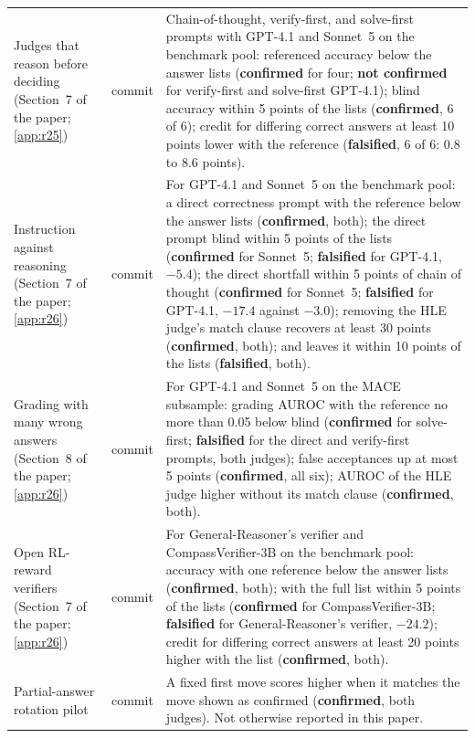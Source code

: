 {\begin{longtable}{L{3.2cm}L{1.1cm}L{8.7cm}}
Judges that reason before deciding (Section~7 of the paper; \cref{app:r25}) & commit & Chain-of-thought, verify-first, and solve-first prompts with GPT-4.1 and Sonnet~5 on the benchmark pool: referenced accuracy below the answer lists (\textbf{confirmed} for four; \textbf{not confirmed} for verify-first and solve-first GPT-4.1); blind accuracy within 5 points of the lists (\textbf{confirmed}, 6 of 6); credit for differing correct answers at least 10 points lower with the reference (\textbf{falsified}, 6 of 6: 0.8 to 8.6 points). \\
Instruction against reasoning (Section~7 of the paper; \cref{app:r26}) & commit & For GPT-4.1 and Sonnet~5 on the benchmark pool: a direct correctness prompt with the reference below the answer lists (\textbf{confirmed}, both); the direct prompt blind within 5 points of the lists (\textbf{confirmed} for Sonnet~5; \textbf{falsified} for GPT-4.1, $-5.4$); the direct shortfall within 5 points of chain of thought (\textbf{confirmed} for Sonnet~5; \textbf{falsified} for GPT-4.1, $-17.4$ against $-3.0$); removing the HLE judge's match clause recovers at least 30 points (\textbf{confirmed}, both); and leaves it within 10 points of the lists (\textbf{falsified}, both). \\
Grading with many wrong answers (Section~8 of the paper; \cref{app:r26}) & commit & For GPT-4.1 and Sonnet~5 on the \textsc{MACE} subsample: grading AUROC with the reference no more than 0.05 below blind (\textbf{confirmed} for solve-first; \textbf{falsified} for the direct and verify-first prompts, both judges); false acceptances up at most 5 points (\textbf{confirmed}, all six); AUROC of the HLE judge higher without its match clause (\textbf{confirmed}, both). \\
Open RL-reward verifiers (Section~7 of the paper; \cref{app:r26}) & commit & For General-Reasoner's verifier and CompassVerifier-3B on the benchmark pool: accuracy with one reference below the answer lists (\textbf{confirmed}, both); with the full list within 5 points of the lists (\textbf{confirmed} for CompassVerifier-3B; \textbf{falsified} for General-Reasoner's verifier, $-24.2$); credit for differing correct answers at least 20 points higher with the list (\textbf{confirmed}, both). \\
Partial-answer rotation pilot & commit & A fixed first move scores higher when it matches the move shown as confirmed (\textbf{confirmed}, both judges). Not otherwise reported in this paper. \\
\end{longtable}
}

